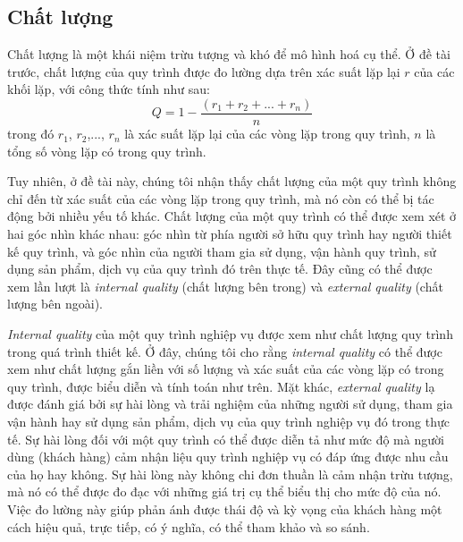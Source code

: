\subsection{Chất lượng}
Chất lượng là một khái niệm trừu tượng và khó để mô hình hoá cụ thể. Ở đề tài trước, chất lượng của quy trình được đo lường dựa trên xác suất lặp lại $r$ của các khối lặp, với công thức tính như sau:
\[ Q = 1 - \frac{(r_1 + r_2 + ... + r_n)}{n}\]
trong đó $r_1$, $r_2$,..., $r_n$ là xác suất lặp lại của các vòng lặp trong quy trình, $n$ là tổng số vòng lặp có trong quy trình.
\par
Tuy nhiên, ở đề tài này, chúng tôi nhận thấy chất lượng của một quy trình không chỉ đến từ xác suất của các vòng lặp trong quy trình, mà nó còn có thể bị tác động bởi nhiều yếu tố khác. Chất lượng của một quy trình có thể được xem xét ở hai góc nhìn khác nhau: góc nhìn từ phía người sở hữu quy trình hay người thiết kế quy trình, và góc nhìn của người tham gia sử dụng, vận hành quy trình, sử dụng sản phẩm, dịch vụ của quy trình đó trên thực tế. Đây cũng có thể được xem lần lượt là \emph{internal quality} (chất lượng bên trong) và \emph{external quality} (chất lượng bên ngoài). 
\par
\emph{Internal quality} của một quy trình nghiệp vụ được xem như chất lượng quy trình trong quá trình thiết kế. Ở đây, chúng tôi cho rằng \emph{internal quality} có thể được xem như chất lượng gắn liền với số lượng và xác suất của các vòng lặp có trong quy trình, được biểu diễn và tính toán như trên. Mặt khác, \emph{external quality} lạ được đánh giá bởi sự hài lòng và trải nghiệm của những người sử dụng, tham gia vận hành hay sử dụng sản phẩm, dịch vụ của quy trình nghiệp vụ đó trong thực tế. Sự hài lòng đối với một quy trình có thể được diễn tả như mức độ mà người dùng (khách hàng) cảm nhận liệu quy trình nghiệp vụ có đáp ứng được nhu cầu của họ hay không. Sự hài lòng này không chi đơn thuần là cảm nhận trừu tượng, mà nó có thể được đo đạc với những giá trị cụ thể biểu thị cho mức độ của nó. Việc đo lường này giúp phản ánh được thái độ và kỳ vọng của khách hàng một cách hiệu quả, trực tiếp, có ý nghĩa, có thể tham khảo và so sánh. 
